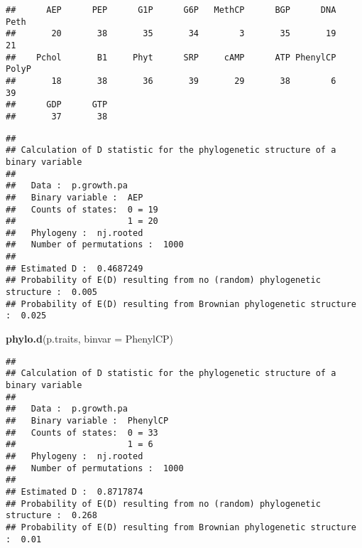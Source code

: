 \documentclass[]{article}
\newenvironment{Shaded}{\begin{snugshade}}{\end{snugshade}}
\newcommand{\KeywordTok}[1]{\textcolor[rgb]{0.13,0.29,0.53}{\textbf{#1}}}
\newcommand{\DataTypeTok}[1]{\textcolor[rgb]{0.13,0.29,0.53}{#1}}
\newcommand{\StringTok}[1]{\textcolor[rgb]{0.31,0.60,0.02}{#1}}
\newcommand{\OperatorTok}[1]{\textcolor[rgb]{0.81,0.36,0.00}{\textbf{#1}}}
\newcommand{\NormalTok}[1]{#1}
\begin{document}
\begin{verbatim}
##      AEP      PEP      G1P      G6P   MethCP      BGP      DNA     Peth 
##       20       38       35       34        3       35       19       21 
##    Pchol       B1     Phyt      SRP     cAMP      ATP PhenylCP    PolyP 
##       18       38       36       39       29       38        6       39 
##      GDP      GTP 
##       37       38
\end{verbatim}

\begin{Shaded}
\end{Shaded}

\begin{verbatim}
## 
## Calculation of D statistic for the phylogenetic structure of a binary variable
## 
##   Data :  p.growth.pa
##   Binary variable :  AEP
##   Counts of states:  0 = 19
##                      1 = 20
##   Phylogeny :  nj.rooted
##   Number of permutations :  1000
## 
## Estimated D :  0.4687249
## Probability of E(D) resulting from no (random) phylogenetic structure :  0.005
## Probability of E(D) resulting from Brownian phylogenetic structure    :  0.025
\end{verbatim}

\begin{Shaded}
\begin{Highlighting}[]
\KeywordTok{phylo.d}\NormalTok{(p.traits, }\DataTypeTok{binvar =}\NormalTok{ PhenylCP)}
\end{Highlighting}
\end{Shaded}

\begin{verbatim}
## 
## Calculation of D statistic for the phylogenetic structure of a binary variable
## 
##   Data :  p.growth.pa
##   Binary variable :  PhenylCP
##   Counts of states:  0 = 33
##                      1 = 6
##   Phylogeny :  nj.rooted
##   Number of permutations :  1000
## 
## Estimated D :  0.8717874
## Probability of E(D) resulting from no (random) phylogenetic structure :  0.268
## Probability of E(D) resulting from Brownian phylogenetic structure    :  0.01
\end{verbatim}
\end{document}
